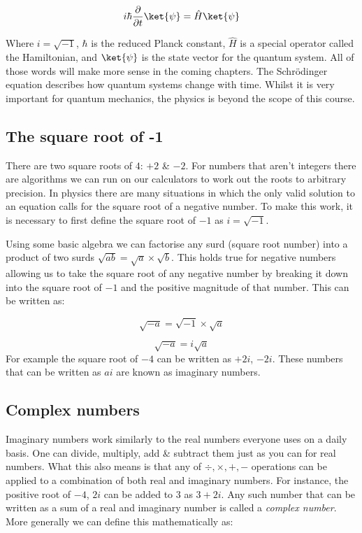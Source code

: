 \documentclass{book}
\begin{document}
$$ i\hbar \frac{\partial{}}{\partial{t}}\ket{\psi} = \hat{H}\ket{\psi} $$

Where $i = \sqrt{-1}$, $\hbar$ is the reduced Planck constant, $\hat{H}$ is a special operator called the Hamiltonian, and $\ket{\psi}$ is the state vector for the quantum system. All of those words will make more sense in the coming chapters. The Schrödinger equation describes how quantum systems change with time. Whilst it is very important for quantum mechanics, the physics is beyond the scope of this course. 

\subsection{ The square root of -1}

There are two square roots of $4$: $+2$ \& $-2$. For numbers that aren't integers there are algorithms we can run on our calculators to work out the roots to arbitrary precision. In physics there are many situations in which the only valid solution to an equation calls for the square root of a negative number. To make this work, it is necessary to first define the square root of $-1$ as $i = \sqrt{-1}$. 

Using some basic algebra we can factorise any surd (square root number) into a product of two surds $ \sqrt{ab} = \sqrt{a} \times \sqrt{b}$. This holds true for negative numbers allowing us to take the square root of any negative number by breaking it down into the square root of $-1$ and the positive magnitude of that number. This can be written as:

$$ \sqrt{-a} = \sqrt{-1} \times \sqrt{a} $$

$$ \sqrt{-a} = i \sqrt{a} $$
For example the square root of $-4$ can be written as $+2i$, $-2i$.
These numbers that can be written as $ai$ are known as imaginary numbers. 

\subsection{ Complex numbers}

Imaginary numbers work similarly to the real numbers everyone uses on a  daily basis. One can divide, multiply, add \& subtract them just as you can for real numbers. What this also means is that any of $ \div ,\times, +, - $ operations can be applied to a combination of both real and imaginary numbers. For instance, the positive root of $-4$, $2i$ can be added to $3$ as $3 + 2i $. Any such number that can be written as a sum of a real and imaginary number is called a \textit{complex number}. More generally we can define this mathematically as:
\end{document}
